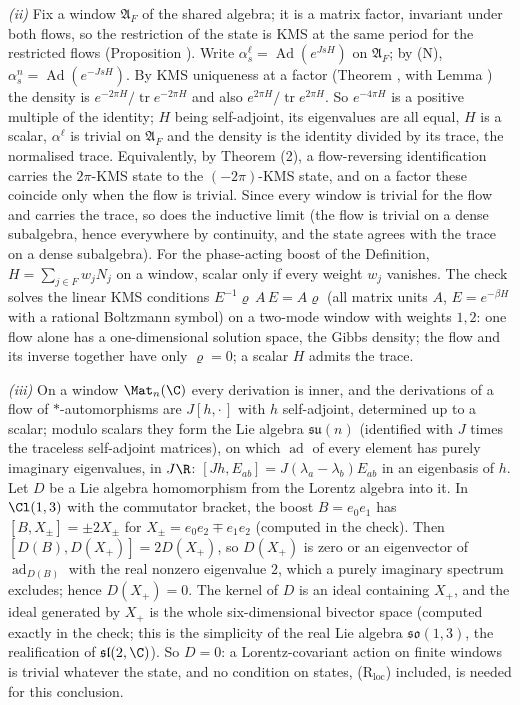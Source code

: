 \emph{(ii)} Fix a window $\mathfrak{A}_{F}$ of the shared algebra; it is a matrix factor, invariant under both flows, so the restriction of the state is KMS at the same period for the restricted flows (Proposition ). Write $\alpha^{\ell}_{s} = \operatorname{Ad}(e^{JsH})$ on $\mathfrak{A}_{F}$; by (N), $\alpha^{n}_{s} = \operatorname{Ad}(e^{-JsH})$. By KMS uniqueness at a factor (Theorem , with Lemma ) the density is $e^{-2\pi H}/\operatorname{tr}e^{-2\pi H}$ and also $e^{2\pi H}/\operatorname{tr}e^{2\pi H}$. So $e^{-4\pi H}$ is a positive multiple of the identity; $H$ being self-adjoint, its eigenvalues are all equal, $H$ is a scalar, $\alpha^{\ell}$ is trivial on $\mathfrak{A}_{F}$ and the density is the identity divided by its trace, the normalised trace. Equivalently, by Theorem (2), a flow-reversing identification carries the $2\pi$-KMS state to the $(-2\pi)$-KMS state, and on a factor these coincide only when the flow is trivial. Since every window is trivial for the flow and carries the trace, so does the inductive limit (the flow is trivial on a dense subalgebra, hence everywhere by continuity, and the state agrees with the trace on a dense subalgebra). For the phase-acting boost of the Definition, $H = \sum_{j \in F} w_{j}N_{j}$ on a window, scalar only if every weight $w_{j}$ vanishes. The check solves the linear KMS conditions $E^{-1}\varrho\,A\,E = A\varrho$ (all matrix units $A$, $E = e^{-\beta H}$ with a rational Boltzmann symbol) on a two-mode window with weights $1, 2$: one flow alone has a one-dimensional solution space, the Gibbs density; the flow and its inverse together have only $\varrho = 0$; a scalar $H$ admits the trace.

\emph{(iii)} On a window $\Mat_{n}(\C)$ every derivation is inner, and the derivations of a flow of $*$-automorphisms are $J[h, \cdot\,]$ with $h$ self-adjoint, determined up to a scalar; modulo scalars they form the Lie algebra $\mathfrak{su}(n)$ (identified with $J$ times the traceless self-adjoint matrices), on which $\operatorname{ad}$ of every element has purely imaginary eigenvalues, in $J\R$: $[Jh, E_{ab}] = J(\lambda_{a} - \lambda_{b})E_{ab}$ in an eigenbasis of $h$. Let $D$ be a Lie algebra homomorphism from the Lorentz algebra into it. In $\Cl(1,3)$ with the commutator bracket, the boost $B = e_{0}e_{1}$ has $[B, X_{\pm}] = \pm 2X_{\pm}$ for $X_{\pm} = e_{0}e_{2} \mp e_{1}e_{2}$ (computed in the check). Then $[D(B), D(X_{+})] = 2D(X_{+})$, so $D(X_{+})$ is zero or an eigenvector of $\operatorname{ad}_{D(B)}$ with the real nonzero eigenvalue $2$, which a purely imaginary spectrum excludes; hence $D(X_{+}) = 0$. The kernel of $D$ is an ideal containing $X_{+}$, and the ideal generated by $X_{+}$ is the whole six-dimensional bivector space (computed exactly in the check; this is the simplicity of the real Lie algebra $\mathfrak{so}(1,3)$, the realification of $\mathfrak{sl}(2,\C)$). So $D = 0$: a Lorentz-covariant action on finite windows is trivial whatever the state, and no condition on states, (R$_{\mathrm{loc}}$) included, is needed for this conclusion.

